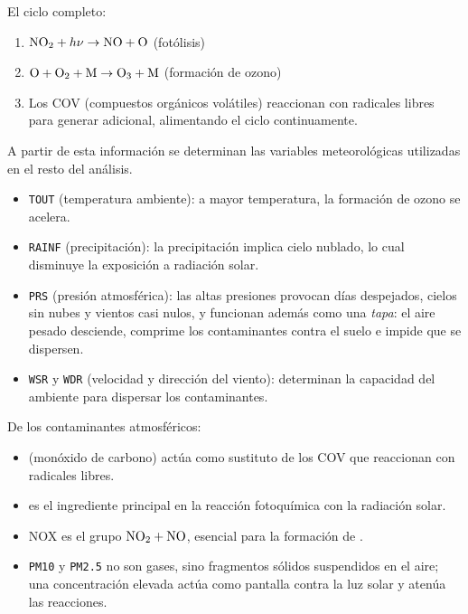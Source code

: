 El ciclo completo:

\begin{enumerate}
    \item $\ce{NO2} + h\nu \to \ce{NO}+\ce{O}$ (fotólisis)
    \item $\ce{O} + \ce{O2} + \ce{M} \to \ce{O3} + \ce{M}$ (formación de ozono)
    \item Los COV (compuestos orgánicos volátiles) reaccionan con radicales libres para generar  adicional, alimentando el ciclo continuamente.
\end{enumerate}

A partir de esta información se determinan las variables meteorológicas utilizadas en el resto del análisis.

\begin{itemize}
    \item \texttt{TOUT} (temperatura ambiente): a mayor temperatura, la formación de ozono se acelera.
    \item \texttt{RAINF} (precipitación): la precipitación implica cielo nublado, lo cual disminuye la exposición a radiación solar.
    \item \texttt{PRS} (presión atmosférica): las altas presiones provocan días despejados, cielos sin nubes y vientos casi nulos, y funcionan además como una \textit{tapa}: el aire pesado desciende, comprime los contaminantes contra el suelo e impide que se dispersen.
    \item \texttt{WSR} y \texttt{WDR} (velocidad y dirección del viento): determinan la capacidad del ambiente para dispersar los contaminantes.
\end{itemize}

De los contaminantes atmosféricos:

\begin{itemize}
    \item {} (monóxido de carbono) actúa como sustituto de los COV que reaccionan con radicales libres.
    \item {} es el ingrediente principal en la reacción fotoquímica con la radiación solar.
    \item NOX es el grupo $\ce{NO2} + \ce{NO}$, esencial para la formación de .
    \item \texttt{PM10} y \texttt{PM2.5} no son gases, sino fragmentos sólidos suspendidos en el aire; una concentración elevada actúa como pantalla contra la luz solar y atenúa las reacciones.
\end{itemize}